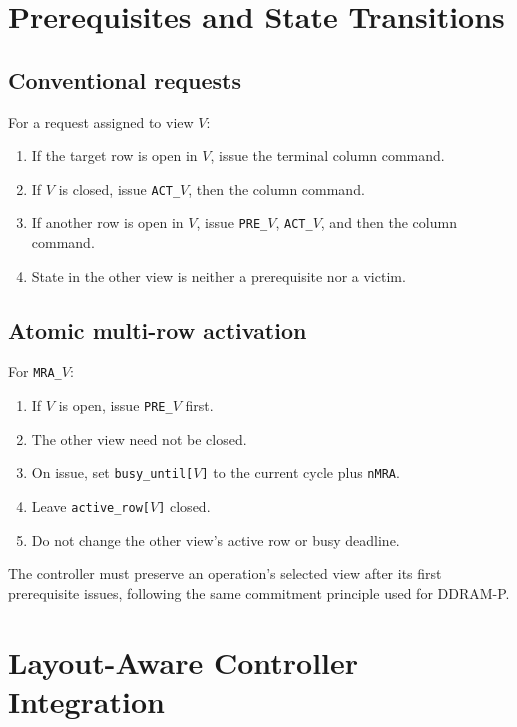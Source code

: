 \documentclass[9pt,twocolumn]{extarticle}
\newcommand{\cmd}[1]{\texttt{#1}}
\newcommand{\param}[1]{\texttt{#1}}
\begin{document}
\section{Prerequisites and State Transitions}

\subsection{Conventional requests}

For a request assigned to view $V$:

\begin{enumerate}
  \item If the target row is open in $V$, issue the terminal column command.
  \item If $V$ is closed, issue \cmd{ACT\_$V$}, then the column command.
  \item If another row is open in $V$, issue \cmd{PRE\_$V$},
        \cmd{ACT\_$V$}, and then the column command.
  \item State in the other view is neither a prerequisite nor a victim.
\end{enumerate}

\subsection{Atomic multi-row activation}

For \cmd{MRA\_$V$}:

\begin{enumerate}
  \item If $V$ is open, issue \cmd{PRE\_$V$} first.
  \item The other view need not be closed.
  \item On issue, set \cmd{busy\_until[$V$]} to the current cycle plus
        \param{nMRA}.
  \item Leave \cmd{active\_row[$V$]} closed.
  \item Do not change the other view's active row or busy deadline.
\end{enumerate}

The controller must preserve an operation's selected view after its first
prerequisite issues, following the same commitment principle used for DDRAM-P.

\section{Layout-Aware Controller Integration}
\label{sec:controller-layout}
\end{document}
